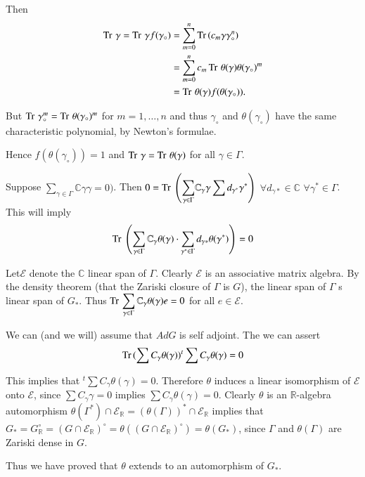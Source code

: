 Then 
\begin{align*}
  \operatorname{Tr\,} \gamma = \operatorname{Tr\,} \gamma f(\gamma_\circ) & = \sum_{m=0}^n \operatorname{Tr\,} (c_m
  \gamma \gamma_\circ^n)\\
  & = \sum_{m=0}^n c_m \operatorname{Tr\,} \theta (\gamma) \theta (\gamma_\circ)^m\\
  & = \operatorname{Tr\,} \theta (\gamma) f (\theta (\gamma_\circ)).
\end{align*}

But $\operatorname{Tr\,} \gamma_\circ^m= \operatorname{Tr\,} \theta (\gamma_\circ)^m$ for $m=1, \ldots
, n$ and thus $\gamma_\circ$ and $\theta (\gamma_\circ)$ have the same
characteristic polynomial, by Newton's formulae.

Hence $f (\theta (\gamma_\circ))=1$ and $\operatorname{Tr\,} \gamma = \operatorname{Tr\,} \theta
(\gamma)$ for all $\gamma \in \Gamma$. 

Suppose $\displaystyle{\sum_{\gamma \in \Gamma}} \mathbb{C} \gamma
\gamma =0)$. Then $0= \operatorname{Tr\,} \left(\displaystyle{\sum_{\gamma \in
    \Gamma}}\mathbb{C}_\gamma \gamma \sum d_{\gamma^*} \gamma^* \right)$
$\forall d_{\gamma *} \in \mathbb{C}$ $\forall \gamma^* \in
\Gamma$. This will imply
$$
\operatorname{Tr\,} \left( \sum_{\gamma \in \Gamma} \mathbb{C}_\gamma \theta (\gamma)
\cdot \sum_{\gamma^* \in \Gamma} d_{\gamma *} \theta (\gamma^*)\right)=0
$$ 

Let\pageoriginale $\mathcal{E}$ denote the $\mathbb{C}$ linear span of
$\Gamma$. Clearly $\mathcal{E}$ is an associative matrix algebra. By
the density theorem (that the Zariski closure of $\Gamma$ is $G$), the
linear span of $\Gamma$ s linear span of $G_*$. Thus $\operatorname{Tr\,}
\displaystyle{\sum_{\gamma \in \Gamma} \mathbb{C}_\gamma \theta
  (\gamma) e= 0}$ for all $e \in \mathcal{E}$.

We can (and we will) assume that $Ad G$ is self adjoint. The we can
assert
$$
\operatorname{Tr\,} (\sum C_\gamma \theta (\gamma)) {}^t \sum C_\gamma \theta (\gamma)=0
$$

This implies that ${}^t \sum C_\gamma \theta (\gamma) =0$. Therefore
$\theta$ induces a linear isomorphism of $\mathcal{E}$ onto
$\mathcal{E}$, since $\sum C_\gamma \gamma =0$ implies $\sum C_\gamma
\theta (\gamma)=0$. Clearly $\theta$ is an $\mathbb{R}$-algebra
automorphism $\theta (\Gamma^*) \cap \mathcal{E}_{\mathbb{R}}= (\theta
(\Gamma))^* \cap \mathcal{E}_\mathbb{R}$ implies that $G_*=
G_\mathbb{R}^\circ = (G \cap \mathcal{E}_\mathbb{R})^\circ= \theta ((G
  \cap \mathcal{E}_\mathbb{R})^\circ) = \theta (G_*)$, since $\Gamma$
  and $\theta (\Gamma)$ are Zariski dense in $G$.

Thus we have proved that $\theta$ extends to an automorphism of
$G_*$. 
